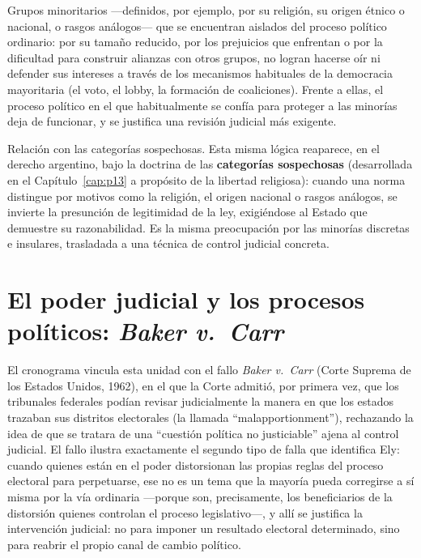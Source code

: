\documentclass[12pt,oneside]{book}
\begin{document}
\begin{defbox}
Grupos minoritarios —definidos, por ejemplo, por su religión, su origen étnico o
nacional, o rasgos análogos— que se encuentran aislados del proceso político
ordinario: por su tamaño reducido, por los prejuicios que enfrentan o por la
dificultad para construir alianzas con otros grupos, no logran hacerse oír ni
defender sus intereses a través de los mecanismos habituales de la democracia
mayoritaria (el voto, el lobby, la formación de coaliciones). Frente a ellas, el
proceso político en el que habitualmente se confía para proteger a las minorías
deja de funcionar, y se justifica una revisión judicial más exigente.
\end{defbox}

\begin{impbox}
Relación con las categorías sospechosas. Esta misma lógica reaparece, en el
derecho argentino, bajo la doctrina de las \textbf{categorías sospechosas}
(desarrollada en el Capítulo~\ref{cap:p13} a propósito de la libertad religiosa):
cuando una norma distingue por motivos como la religión, el origen nacional o
rasgos análogos, se invierte la presunción de legitimidad de la ley, exigiéndose
al Estado que demuestre su razonabilidad. Es la misma preocupación por las
minorías discretas e insulares, trasladada a una técnica de control judicial
concreta.
\end{impbox}

\section{El poder judicial y los procesos políticos: \textit{Baker v.\ Carr}}

El cronograma vincula esta unidad con el fallo \textit{Baker v.\ Carr} (Corte
Suprema de los Estados Unidos, 1962), en el que la Corte admitió, por primera vez,
que los tribunales federales podían revisar judicialmente la manera en que los
estados trazaban sus distritos electorales (la llamada ``malapportionment''),
rechazando la idea de que se tratara de una ``cuestión política no justiciable''
ajena al control judicial. El fallo ilustra exactamente el segundo tipo de falla
que identifica Ely: cuando quienes están en el poder distorsionan las propias
reglas del proceso electoral para perpetuarse, ese no es un tema que la mayoría
pueda corregirse a sí misma por la vía ordinaria —porque son, precisamente, los
beneficiarios de la distorsión quienes controlan el proceso legislativo—, y allí
se justifica la intervención judicial: no para imponer un resultado electoral
determinado, sino para reabrir el propio canal de cambio político.
\end{document}
